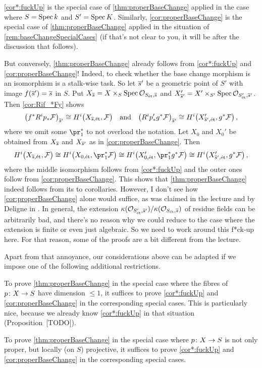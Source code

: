 \documentclass[a4paper, 10pt, oneside, DIV=9, chapterprefix=true, numbers=enddot, bibliography=totoc]{scrbook}
\begin{document}
\begin{rem}\label{rem:fuckUp}
\cref{cor*:fuckUp} is the special case of \cref{thm:properBaseChange} applied in the case where $S=\operatorname{Spec} k$ and $S'=\operatorname{Spec} K$. Similarly,
\cref{cor:properBaseChange} is the special case of \cref{thm:properBaseChange} applied in the situation of \cref{rem:baseChangeSpecialCases} (if that's not clear to you, it will be after the discussion that follows).

But conversely, \cref{thm:properBaseChange} already follows from \cref{cor*:fuckUp} and \cref{cor:properBaseChange}! Indeed, to check whether the base change morphism is an isomorphism is a stalk-wise task. So let $\ov{s}'$ be a geometric point of $S'$ with image $f(\ov{s}')=\ov{s}$ in $S$. Put $X_{\ov{s}}=X\times_S\Spec \Oo_{S_\et,\ov{s}}$ and $X'_{\ov{s}'}=X'\times_{S'}\Spec \Oo_{S'_\et,\ov{s}'}$. Then \cref{cor:Rif_*Fy} shows
\begin{equation*}
	\big(f^*R^i p_*\Ff\big)_{\ov{s}'}\cong H^i\big(X_{\ov
	s,\et},\Ff\big)\quad\text{and}\quad \big(R^i p'_*g^*\Ff\big)_{\ov s'}\cong H^i\big(X'_{\ov{s}',\et},g^*\Ff\big)\,,
\end{equation*}
where we omit some $\pr_1^*$ to not overload the notation. Let $X_0$ and $X_0'$ be obtained from $X_{\ov{s}}$ and $X_{\ov{s}'}$ as in \cref{cor:properBaseChange}. Then
\begin{equation*}
	H^i\big(X_{\ov s,\et},\Ff\big)\cong H^i\big(X_{0,\et},\pr_1^*\Ff\big)\cong H^i\big(X'_{0,\et},\pr_1^*g^*\Ff\big)\cong H^i\big(X'_{\ov s',\et},g^*\Ff\big)\,,
\end{equation*}
where the middle isomorphism follows from \cref{cor*:fuckUp} and the outer ones follow from \cref{cor:properBaseChange}. This shows that \cref{thm:properBaseChange} indeed follows from its to corollaries. However, I don't see how \cref{cor:properBaseChange} alone would suffice, as was claimed in the lecture and by Deligne in \cite[Arcata~IV]{sga4.5}. In general, the extension $\kappa(\Oo_{S'_\et,\ov{s}'})/\kappa(\Oo_{S_\et,\ov{s}})$ of residue fields can be arbitrarily bad, and there's no reason why we could reduce to the case where the extension is finite or even just algebraic. So we need to work around this f*ck-up here. For that reason, some of the proofs are a bit different from the lecture.

Apart from that annoyance, our considerations above can be adapted if we impose one of the following additional restrictions.
\begin{numerate}
	\item To prove \cref{thm:properBaseChange} in the special case where the fibres of $p\colon X\morphism S$ have dimension $\leq 1$, it suffices to prove \cref{cor*:fuckUp} and \cref{cor:properBaseChange} in the corresponding special cases. This is particularly nice, because we already know \cref{cor*:fuckUp} in that situation (Proposition~[TODO]).
	\item To prove \cref{thm:properBaseChange} in the special case where $p\colon X\morphism S$ is not only proper, but locally (on $S$) projective, it suffices to prove \cref{cor*:fuckUp} and \cref{cor:properBaseChange} in the corresponding special cases.
\end{numerate}
\end{rem}
\end{document}
